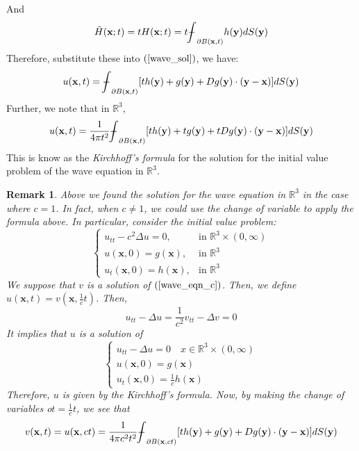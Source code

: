 \documentclass[10pt]{article}
\def\rr{{\mathbb R}}
\def\vc{{\mathbf x}}
\def\vcc{{\mathbf y}}
\newtheorem{remark}{Remark}[section]
\newcommand\tbbint{{-\mkern -16mu\int}}
\newcommand\dbbint{{-\mkern -19mu\int}}
\newcommand\bbint{
{\mathchoice{\dbbint}{\tbbint}{\tbbint}{\tbbint}}
}
\begin{document}
And
\begin{equation*}
    \tilde{H}(\vc; t) =t H(\vc;t) =t \bbint_{\partial B(\vc,t)} h(\vcc) dS(\vcc)
\end{equation*}
Therefore, substitute these into $(\ref{wave_sol})$, we have:
\begin{equation}
    \label{wave_sol_smooth}
    u(\vc,t) = \bbint_{\partial B(\vc,t)} [t h(\vcc) + g(\vcc) + Dg(\vcc) \cdot (\vcc-\vc)] dS(\vcc)
\end{equation}
Further, we note that in $\rr^3$,
\begin{equation}
    \label{wave_sol_smooth_2}
    u(\vc,t) = \frac{1}{4\pi t^2} \bbint_{\partial B(\vc,t)} [t h(\vcc) + t g(\vcc) + t Dg(\vcc) \cdot (\vcc-\vc)] dS(\vcc)
\end{equation}
This is know as the \textit{Kirchhoff's formula} for the solution for the initial value problem of the wave equation in $\rr^3$.
\begin{remark}
    Above we found the solution for the wave equation in $\rr^3$ in the case where $c=1$. In fact, when $c\neq 1$, we could use the change of variable to apply the formula above. In particular, consider the initial value problem:
    \begin{equation}
        \label{wave_eqn_c}
        \begin{cases}
            u_{tt} - c^2 \Delta u = 0, & \text{in } \rr^3 \times (0,\infty)\\
            u(\vc,0) = g(\vc), & \text{in } \rr^3\\
            u_t(\vc,0) = h(\vc), & \text{in } \rr^3
        \end{cases}
    \end{equation}
    We suppose that $v$ is a solution of $(\ref{wave_eqn_c})$. Then, we define $u(\vc,t) = v(\vc, \frac{1}{c}t)$. Then,
    \begin{equation*}
        u_{tt} - \Delta u = \frac{1}{c^2}v_{tt} -  \Delta v = 0
    \end{equation*}
    It implies that $u$ is a solution of
    \begin{equation*}
        \begin{cases}
            u_{tt} - \Delta u = 0\quad x\in \rr^3 \times (0,\infty)\\ 
            u(\vc,0) = g(\vc)\\
            u_t(\vc,0) = \frac{1}{c}h(\vc)
        \end{cases}
    \end{equation*}
    Therefore, $u$ is given by the Kirchhoff's formula. Now, by making the change of variables o$t = \frac{1}{c} t$, we see that
    \begin{equation*}
        v(\vc,t) = u(\vc,ct) = \frac{1}{4\pi c^2 t^2} \bbint_{\partial B(\vc,ct)} [t h(\vcc) + g(\vcc) +  Dg(\vcc) \cdot (\vcc-\vc)] dS(\vcc)
    \end{equation*}
\end{remark}
\end{document}
